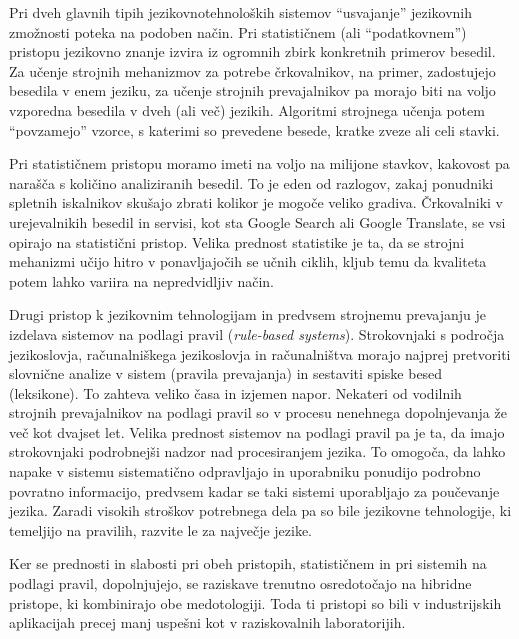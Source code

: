 \begin{multicols}{2}

Pri dveh glavnih tipih jezikovnotehnoloških sistemov “usvajanje” jezikovnih zmožnosti poteka na podoben način. Pri statističnem (ali “podatkovnem”) pristopu jezikovno znanje izvira iz ogromnih zbirk konkretnih primerov besedil. Za učenje stroj\-nih mehanizmov za potrebe črkovalnikov, na primer, zadostujejo besedila v enem jeziku, za učenje stroj\-nih prevajalnikov pa morajo biti na voljo vzporedna besedila v dveh (ali več) jezikih. Algoritmi stroj\-nega učenja potem “povzamejo” vzorce, s katerimi so prevedene besede, kratke zveze ali celi stavki.

Pri statističnem pristopu moramo imeti na voljo na mili\-jone stavkov,  kakovost pa narašča s količino analiziranih besedil. To je eden od razlogov, zakaj ponudniki spletnih iskalnikov skušajo zbrati kolikor je mogoče veliko gradiva. Črkovalniki v urejevalnikih besedil in servisi, kot sta Google Search ali Google Translate, se vsi opirajo na statistični pristop. Velika prednost statistike je ta, da se stroj\-ni mehanizmi učijo hitro v ponav\-ljajočih se učnih ciklih, kljub temu da kvaliteta potem lahko variira na nepredvidljiv način.\vspace*{0.4 cm}

Drugi pristop k jezikovnim tehnologijam in predvsem stroj\-nemu prevajanju je izdelava sistemov na podlagi pravil (\textit{rule-based systems}). Strokovnjaki s področja jezikoslovja, računalniškega jezikoslovja in računalništva morajo naj\-prej pretvoriti slovnične analize v sistem (pravila prevajanja) in sestaviti spiske besed (leksikone). To zah\-teva veliko časa in izjemen napor. Nekateri od vodilnih stroj\-nih prevajalnikov na podlagi pravil so v procesu nenehnega dopolnjevanja že več kot dvajset let. Velika prednost sistemov na podlagi pravil pa je ta, da imajo strokovnjaki podrobnejši nadzor nad procesi\-ranjem jezika. To omogoča, da lahko napake v sistemu  sistema\-tično odprav\-ljajo in uporabniku ponudijo podrobno povratno informacijo, predvsem kadar se taki sistemi uporab\-ljajo za poučevanje jezika. Zaradi visokih stroškov potrebnega dela pa so bile jezikovne tehnologije, ki temeljijo na pravilih, razvite le za naj\-večje jezike.\vspace*{0.4 cm}

Ker se prednosti in slabosti pri obeh pristopih, statističnem in pri sistemih na podlagi pravil, dopolnjujejo, se raziskave trenutno osredotočajo na hibridne pristope, ki kombinirajo obe medotologiji. Toda ti pristopi so bili v industrijskih aplikacijah precej manj uspešni kot v raziskovalnih laboratorijih. \vspace*{0.4 cm}


\end{multicols}
